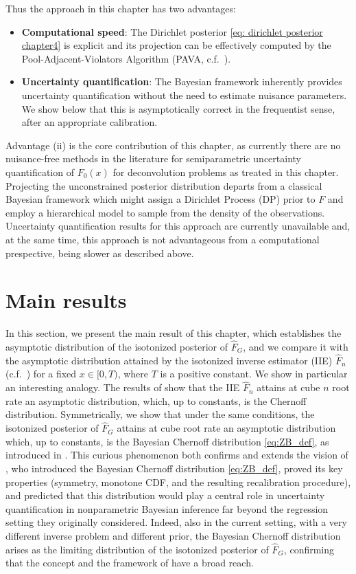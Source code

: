 Thus the approach in this chapter has two advantages:
\begin{itemize}
	\item[(i)] \textbf{Computational speed}: The Dirichlet posterior \eqref{eq: dirichlet posterior chapter4} is explicit and its projection can be effectively computed by the Pool-Adjacent-Violators Algorithm (PAVA, c.f.\ \cite{61}).  
	\item[(ii)] \textbf{Uncertainty quantification}: The Bayesian framework inherently provides uncertainty quantification without the need to estimate nuisance parameters. We show below that this is asymptotically correct in the frequentist sense, after an appropriate calibration.
\end{itemize}
Advantage (ii) is the core contribution of this chapter, as currently there are no nuisance-free methods in the literature for semiparametric uncertainty quantification of $F_0(x)$ for deconvolution problems as treated in this chapter. Projecting the unconstrained posterior distribution departs from a classical Bayesian framework which might assign a Dirichlet Process (DP) prior to \( F \) and employ a hierarchical model to sample from the density of the observations. Uncertainty quantification results for this approach are currently unavailable and, at the same time, this approach is not advantageous from a computational prespective, being slower as described above.


\section{Main results}\label{sec: main results chapter4}

In this section, we present the main result of this chapter, which establishes the asymptotic distribution of the isotonized posterior of $\hat{F}_{\scriptscriptstyle{G}}$, and we compare it with the asymptotic distribution attained by the isotonized inverse estimator (IIE) $\hat{F}_n$ (c.f.\ \cite{74}) for a fixed $x \in [0, T)$, where $T$ is a positive constant. We show in particular an interesting analogy. The results of \cite{74} show that the IIE $\hat{F}_n$
attains at cube $n$ root rate an asymptotic distribution, which, up to constants, is the Chernoff distribution. Symmetrically, we show that under the same conditions, the isotonized posterior of $\hat{F}_{\scriptscriptstyle{G}}$ attains at cube root rate an asymptotic distribution which, up to constants, is the Bayesian Chernoff distribution \eqref{eq:ZB_def}, as introduced in \cite{54}. This curious phenomenon both confirms and extends the vision of \cite{54}, who introduced the Bayesian Chernoff distribution \eqref{eq:ZB_def}, proved its key properties (symmetry, monotone CDF, and the resulting recalibration procedure), and predicted that this distribution would play a central role in uncertainty quantification in nonparametric Bayesian inference far beyond the regression setting they originally considered. Indeed, also in the current setting, with a very different inverse problem and different prior, the Bayesian Chernoff distribution arises as the limiting distribution of the isotonized posterior of $\hat{F}_{\scriptscriptstyle{G}}$, confirming that the concept and the framework of \cite{54} have a broad reach.

